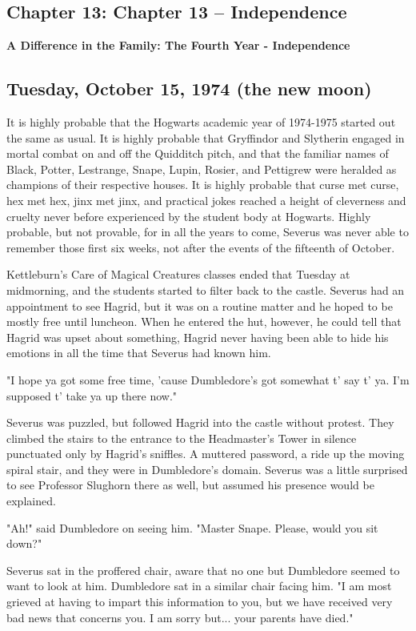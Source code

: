 \documentclass[a4paper,11pt]{article}
\begin{document}
\subsection{Chapter 13: Chapter 13 – Independence}

\textbf{A Difference in the Family: The Fourth Year - Independence}

\subsection{Tuesday, October 15, 1974 (the new moon)}

It is highly probable that the Hogwarts academic year of 1974-1975 started out the same as usual. It is highly probable that Gryffindor and Slytherin engaged in mortal combat on and off the Quidditch pitch, and that the familiar names of Black, Potter, Lestrange, Snape, Lupin, Rosier, and Pettigrew were heralded as champions of their respective houses. It is highly probable that curse met curse, hex met hex, jinx met jinx, and practical jokes reached a height of cleverness and cruelty never before experienced by the student body at Hogwarts. Highly probable, but not provable, for in all the years to come, Severus was never able to remember those first six weeks, not after the events of the fifteenth of October.

Kettleburn's Care of Magical Creatures classes ended that Tuesday at midmorning, and the students started to filter back to the castle. Severus had an appointment to see Hagrid, but it was on a routine matter and he hoped to be mostly free until luncheon. When he entered the hut, however, he could tell that Hagrid was upset about something, Hagrid never having been able to hide his emotions in all the time that Severus had known him.

"I hope ya got some free time, 'cause Dumbledore's got somewhat t' say t' ya. I'm supposed t' take ya up there now."

Severus was puzzled, but followed Hagrid into the castle without protest. They climbed the stairs to the entrance to the Headmaster's Tower in silence punctuated only by Hagrid's sniffles. A muttered password, a ride up the moving spiral stair, and they were in Dumbledore's domain. Severus was a little surprised to see Professor Slughorn there as well, but assumed his presence would be explained.

"Ah!" said Dumbledore on seeing him. "Master Snape. Please, would you sit down?"

Severus sat in the proffered chair, aware that no one but Dumbledore seemed to want to look at him. Dumbledore sat in a similar chair facing him. "I am most grieved at having to impart this information to you, but we have received very bad news that concerns you. I am sorry but... your parents have died."
\end{document}
